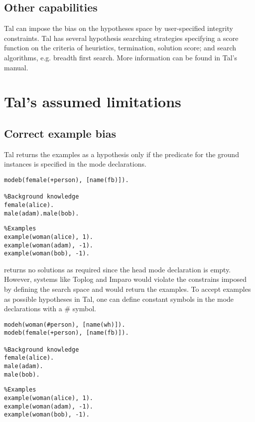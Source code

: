 \subsection{Other capabilities}
Tal can impose the bias on the hypotheses space by user-specified integrity constraints. Tal has several hypothesis searching strategies specifying a score function on the criteria of heuristics, termination, solution score; and search algorithms, e.g. breadth first search. More information can be found in Tal's manual.

\section{Tal's assumed limitations}

\subsection{Correct example bias}
Tal returns the examples as a hypothesis only if the predicate for the ground instances is specified in the mode declarations.

\begin{minipage}[t]{.55\textwidth}
\begin{lstlisting}
modeb(female(+person), [name(fb)]).

%Background knowledge
female(alice).
male(adam).male(bob).
\end{lstlisting}
\end{minipage}
\begin{minipage}[t]{.20\textwidth}
\begin{lstlisting}
%Examples
example(woman(alice), 1).
example(woman(adam), -1).
example(woman(bob), -1).
\end{lstlisting}
\end{minipage}

returns no solutions as required since the head mode declaration is empty. However, systems like Toplog and Imparo would violate the constrains imposed by defining the search space and would return the examples.
To accept examples as possible hypotheses in Tal, one can define constant symbols in the mode declarations with a \# symbol.

\begin{minipage}[t]{.55\textwidth}
\begin{lstlisting}
modeh(woman(#person), [name(wh)]).
modeb(female(+person), [name(fb)]).

%Background knowledge
female(alice).
male(adam).
male(bob).
\end{lstlisting}
\end{minipage}
\begin{minipage}[t]{.20\textwidth}
\begin{lstlisting}
%Examples
example(woman(alice), 1).
example(woman(adam), -1).
example(woman(bob), -1).
\end{lstlisting}
\end{minipage}

